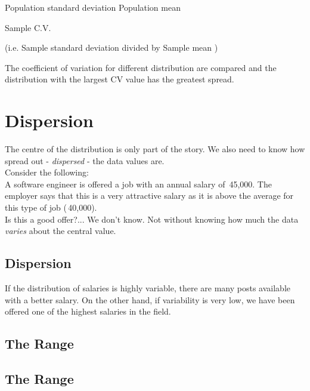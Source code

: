\documentclass[]{report}
\begin{document}
Population standard deviation
Population mean




{Sample C.V.}




(i.e.     Sample standard deviation divided by Sample mean )


The coefficient of variation for different distribution are compared and the distribution with the largest CV value has the greatest spread.



\section{Dispersion}

The centre of the distribution is only part of the story. We also need to know how spread out - \emph{dispersed} - the data values are.\\[0.8cm]

Consider the following:\\[0.4cm]

A software engineer is offered a job with an annual salary of \texteuro\,45,000. The employer says that this is a very attractive salary as it is above the average for this type of job (\texteuro\,40,000).\\[0.4cm]
Is this a good offer?... We don't know. Not without knowing how much the data \emph{varies} about the central value.



\subsection{Dispersion}

If the distribution of salaries is highly variable, there are many posts available with a better salary. On the other hand, if variability is very low, we have been offered one of the highest salaries in the field.



\subsection{The Range}
{ \subsection{The Range}}
\end{document}
